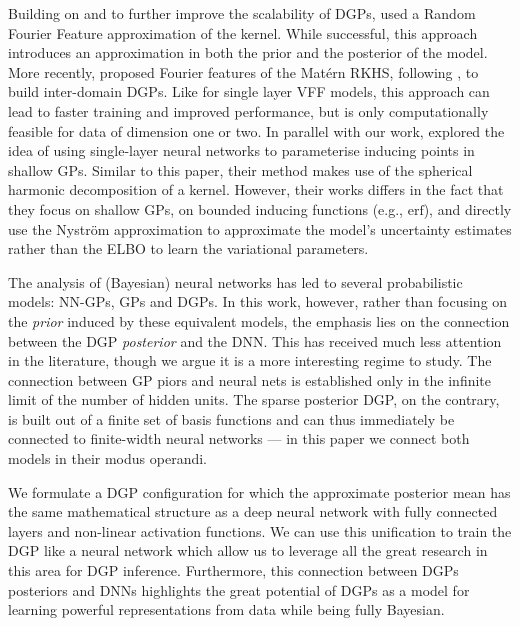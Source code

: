 Building on \citet{salimbeni2017doubly} and to further improve the scalability of DGPs, \citet{cutajar2017random} used a Random Fourier Feature \citep[RFF]{rahimi2008random} approximation of the kernel. While successful, this approach introduces an approximation in both the prior and the posterior of the model. More recently, \citet{rudner2020inter} proposed Fourier features of the Mat\'ern RKHS, following \citet[Variational Fourier Features (VFF)]{hensman2017variational}, to build inter-domain DGPs. Like for single layer VFF models, this approach can lead to faster training and improved performance, but is only computationally feasible for data of dimension one or two. In parallel with our work, \citet{sun2021neural} explored the idea of using single-layer neural networks to parameterise inducing points in shallow GPs. Similar to this paper, their method makes use of the spherical harmonic decomposition of a kernel. However, their works differs in the fact that they focus on shallow GPs, on bounded inducing functions (e.g.,  $\textrm{erf}$), and directly use the Nystr\"om approximation to approximate the model's uncertainty estimates rather than the ELBO to learn the variational parameters.

The analysis of (Bayesian) neural networks has led to several probabilistic models: NN-GPs, GPs and DGPs. In this work, however, rather than focusing on the \emph{prior} induced by these equivalent models, the emphasis lies on the connection between the DGP \emph{posterior} and the DNN. This has received much less attention in the literature, though we argue it is a more interesting regime to study. The connection between GP piors and neural nets is established only in the infinite limit of the number of hidden units. The sparse posterior DGP, on the contrary, is built out of a finite set of basis functions and can thus immediately be connected to finite-width neural networks --- in this paper we connect both models in their modus operandi.

We formulate a DGP configuration for which the approximate posterior mean has the same mathematical structure as a deep neural network with fully connected layers and non-linear activation functions. We can use this unification to train the DGP like a neural network which allow us to leverage all the great research in this area for DGP inference. Furthermore, this connection between DGPs posteriors and DNNs highlights the great potential of DGPs as a model for learning powerful representations from data while being fully Bayesian.